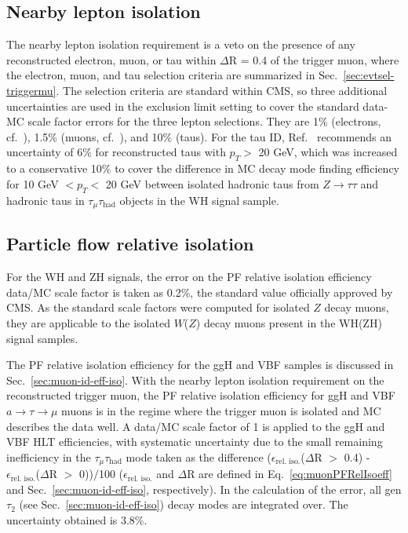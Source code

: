 \subsection{Nearby lepton isolation\label{lepideff-leptonveto}}

The nearby lepton isolation requirement is a veto on the presence of any reconstructed electron, muon, or tau within $\Delta$R = 0.4 of the trigger muon, where the electron, muon, and tau selection criteria are summarized in Sec.~\ref{sec:evtsel-triggermu}.  The selection criteria are standard within CMS, so three additional uncertainties are used in the exclusion limit setting to cover the standard data-MC scale factor errors for the three lepton selections.  They are 1\% (electrons, cf.~\cite{CMS:egammauncertaintytwiki}), 1.5\% (muons, cf.~\cite{CMS:muonuncertaintytwiki}), and 10\% (taus).  For the tau ID, Ref.~\cite{CMS:tauuncertaintytwiki} recommends an uncertainty of 6\% for reconstructed taus with $p_T >$ 20 GeV, which was increased to a conservative 10\% to cover the difference in MC decay mode finding efficiency for 10 GeV $< p_T <$ 20 GeV between isolated hadronic taus from $Z\rightarrow\tau\tau$ and hadronic taus in $\tau_{\mu}\tau_{\text{had}}$ objects in the WH signal sample.

\subsection{Particle flow relative isolation\label{lepideff-iso}}

For the WH and ZH signals, the error on the PF relative isolation efficiency data/MC scale factor is taken as 0.2\%, the standard value officially approved by CMS.  As the standard scale factors were computed for isolated $Z$ decay muons, they are applicable to the isolated $W$($Z$) decay muons present in the WH(ZH) signal samples.

The PF relative isolation efficiency for the ggH and VBF samples is discussed in Sec.~\ref{sec:muon-id-eff-iso}. With the nearby lepton isolation requirement on the reconstructed trigger muon, the PF relative isolation efficiency for ggH and VBF $a\rightarrow\tau\rightarrow\mu$ muons is in the regime where the trigger muon is isolated and MC describes the data well.  A data/MC scale factor of 1 is applied to the ggH and VBF HLT efficiencies, with systematic uncertainty due to the small remaining inefficiency in the $\tau_{\mu}\tau_{\text{had}}$ mode taken as the difference ($\epsilon_{\text{rel. iso.}}$($\Delta$R $>$ 0.4) - $\epsilon_{\text{rel. iso.}}$($\Delta$R $>$ 0))$/$100 ($\epsilon_{\text{rel. iso.}}$ and $\Delta$R are defined in Eq.~\ref{eq:muonPFRelIsoeff} and Sec.~\ref{sec:muon-id-eff-iso}, respectively).  In the calculation of the error, all gen $\tau_{\text{2}}$ (see Sec.~\ref{sec:muon-id-eff-iso}) decay modes are integrated over.  The uncertainty obtained is 3.8\%.

